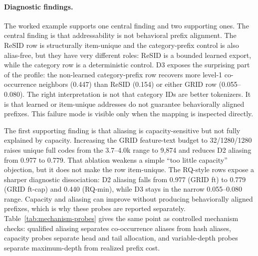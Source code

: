 \paragraph{Diagnostic findings.}
The worked example supports one central finding and two supporting ones. The
central finding is that addressability is not behavioral prefix alignment. The
ReSID row is structurally item-unique and the category-prefix control is also
alias-free, but they have very different roles: ReSID is a bounded learned
export, while the category row is a deterministic control. D3 exposes the
surprising part of the profile: the non-learned category-prefix row recovers
more level-1 co-occurrence neighbors (0.447) than ReSID (0.154) or either
GRID row (0.055--0.080). The right interpretation is not that category IDs
are better tokenizers. It is that learned or item-unique addresses do not
guarantee behaviorally aligned prefixes. This failure mode is visible only when
the mapping is inspected directly.

The first supporting finding is that aliasing is capacity-sensitive but not
fully explained by capacity. Increasing the GRID feature-text budget to
32/1280/1280 raises unique full codes from the 3.7--4.0k range to 9,874 and
reduces D2 aliasing from 0.977 to 0.779. That ablation weakens a simple
``too little capacity'' objection, but it does not make the row item-unique.
The RQ-style rows expose a sharper diagnostic dissociation: D2 aliasing falls
from 0.977 (GRID ft) to 0.779 (GRID ft-cap) and 0.440 (RQ-min), while D3
stays in the narrow 0.055--0.080 range. Capacity and aliasing can improve
without producing behaviorally aligned prefixes, which is why these probes are
reported separately. Table~\ref{tab:mechanism-probes} gives the same point as
controlled mechanism checks: qualified aliasing separates co-occurrence aliases
from hash aliases, capacity probes separate head and tail allocation, and
variable-depth probes separate maximum-depth from realized prefix cost.

